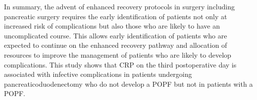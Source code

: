 In summary, the advent of enhanced recovery protocols in surgery including pancreatic surgery requires the early identification of patients not only at increased risk of complications but also those who are likely to have an uncomplicated course. This allows early identification of patients who are expected to continue on the enhanced recovery pathway and allocation of resources to improve the management of patients who are likely to develop complications. This study shows that CRP on the third postoperative day is associated with infective complications in patients undergoing pancreaticoduodenectomy who do not develop a POPF but not in patients with a POPF.
